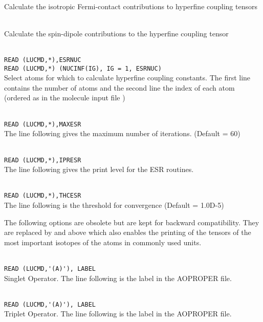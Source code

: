 \begin{description}
\item{} \\
Calculate the isotropic Fermi-contact contributions to hyperfine coupling tensors

\item{} \\
Calculate the spin-dipole contributions to the hyperfine coupling tensor

\item{} \\
\verb|READ (LUCMD,*),ESRNUC |\\
\verb|READ (LUCMD,*) (NUCINF(IG), IG = 1, ESRNUC) | \\
Select atoms for which to calculate hyperfine coupling constants.
The first line contains  the number of atoms and the second line the
index of each atom (ordered as in the molecule input file \molinp)

\item{}      \\
\verb|READ (LUCMD,*),MAXESR |\\
   The line following gives the maximum number of iterations.  (Default = 60)

\item{}     \\
\verb|READ (LUCMD,*),IPRESR |\\
   The line following gives the print level for the ESR routines.

\item{}     \\
\verb|READ (LUCMD,*),THCESR|\\
   The line following is the threshold for convergence (Default = 1.0D-5)

\end{description}
The following options are obsolete but are kept for backward compatibility.
They are replaced by  and  above which also
enables the printing of the tensors of the most important isotopes of the
atoms in commonly used units.
\begin{description}

\item{}    \\
\verb|READ (LUCMD,'(A)'), LABEL|\\
   Singlet Operator. The line following is the label in the AOPROPER file.

\item{}    \\
\verb|READ (LUCMD,'(A)'), LABEL |\\
   Triplet Operator. The line following is the label in the AOPROPER file.


\end{description}

